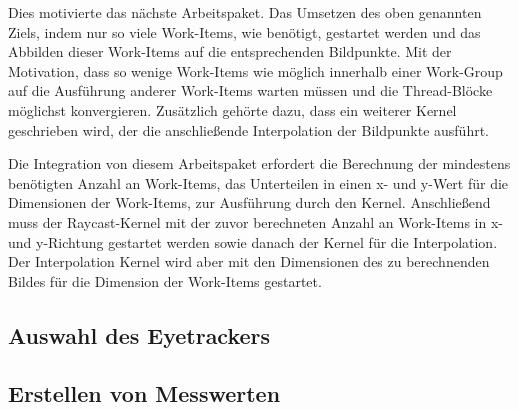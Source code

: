 Dies motivierte das nächste Arbeitspaket.
Das Umsetzen des oben genannten Ziels, indem nur so viele Work-Items, wie benötigt, gestartet werden und das Abbilden dieser Work-Items auf die entsprechenden Bildpunkte.
Mit der Motivation, dass so wenige Work-Items wie möglich innerhalb einer Work-Group auf die Ausführung anderer Work-Items warten müssen und die Thread-Blöcke möglichst konvergieren.
Zusätzlich gehörte dazu, dass ein weiterer Kernel geschrieben wird, der die anschließende Interpolation der Bildpunkte ausführt.

Die Integration von diesem Arbeitspaket erfordert die Berechnung der mindestens benötigten Anzahl an Work-Items, das Unterteilen in einen x- und y-Wert für die Dimensionen der Work-Items, zur Ausführung durch den Kernel.
Anschließend muss der Raycast-Kernel mit der zuvor berechneten Anzahl an Work-Items in x- und y-Richtung gestartet werden sowie danach der Kernel für die Interpolation.
Der Interpolation Kernel wird aber mit den Dimensionen des zu berechnenden Bildes für die Dimension der Work-Items gestartet. 

\subsection*{Auswahl des Eyetrackers}

\subsection*{Erstellen von Messwerten}

